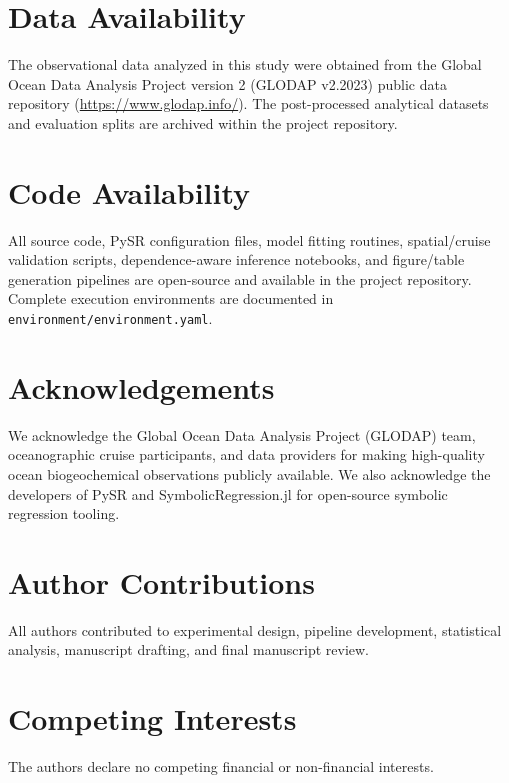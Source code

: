 \section*{Data Availability}
The observational data analyzed in this study were obtained from the Global Ocean Data Analysis Project version 2 (GLODAP v2.2023) public data repository (\url{https://www.glodap.info/}). The post-processed analytical datasets and evaluation splits are archived within the project repository.

\section*{Code Availability}
All source code, PySR configuration files, model fitting routines, spatial/cruise validation scripts, dependence-aware inference notebooks, and figure/table generation pipelines are open-source and available in the project repository. Complete execution environments are documented in \texttt{environment/environment.yaml}.

\section*{Acknowledgements}
We acknowledge the Global Ocean Data Analysis Project (GLODAP) team, oceanographic cruise participants, and data providers for making high-quality ocean biogeochemical observations publicly available. We also acknowledge the developers of PySR and SymbolicRegression.jl for open-source symbolic regression tooling.

\section*{Author Contributions}
All authors contributed to experimental design, pipeline development, statistical analysis, manuscript drafting, and final manuscript review.

\section*{Competing Interests}
The authors declare no competing financial or non-financial interests.
